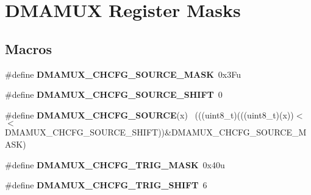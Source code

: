 \hypertarget{group___d_m_a_m_u_x___register___masks}{}\section{D\+M\+A\+M\+U\+X Register Masks}
\label{group___d_m_a_m_u_x___register___masks}
\subsection*{Macros}
\begin{DoxyCompactItemize}
\item 
\hypertarget{group___d_m_a_m_u_x___register___masks_ga35b279ba0b1c9e817901494cdac305c5}{}\#define {\bfseries D\+M\+A\+M\+U\+X\+\_\+\+C\+H\+C\+F\+G\+\_\+\+S\+O\+U\+R\+C\+E\+\_\+\+M\+A\+S\+K}~0x3\+Fu\label{group___d_m_a_m_u_x___register___masks_ga35b279ba0b1c9e817901494cdac305c5}

\item 
\hypertarget{group___d_m_a_m_u_x___register___masks_gac2b7553c4599d8e919750598dd03f8a3}{}\#define {\bfseries D\+M\+A\+M\+U\+X\+\_\+\+C\+H\+C\+F\+G\+\_\+\+S\+O\+U\+R\+C\+E\+\_\+\+S\+H\+I\+F\+T}~0\label{group___d_m_a_m_u_x___register___masks_gac2b7553c4599d8e919750598dd03f8a3}

\item 
\hypertarget{group___d_m_a_m_u_x___register___masks_ga7e6dbf37a88078ee1e84987e92d737db}{}\#define {\bfseries D\+M\+A\+M\+U\+X\+\_\+\+C\+H\+C\+F\+G\+\_\+\+S\+O\+U\+R\+C\+E}(x)                                  ~(((uint8\+\_\+t)(((uint8\+\_\+t)(x))$<$$<$D\+M\+A\+M\+U\+X\+\_\+\+C\+H\+C\+F\+G\+\_\+\+S\+O\+U\+R\+C\+E\+\_\+\+S\+H\+I\+F\+T))\&D\+M\+A\+M\+U\+X\+\_\+\+C\+H\+C\+F\+G\+\_\+\+S\+O\+U\+R\+C\+E\+\_\+\+M\+A\+S\+K)\label{group___d_m_a_m_u_x___register___masks_ga7e6dbf37a88078ee1e84987e92d737db}

\item 
\hypertarget{group___d_m_a_m_u_x___register___masks_gafd2b6158f86bedffb640e73c40cdd0f5}{}\#define {\bfseries D\+M\+A\+M\+U\+X\+\_\+\+C\+H\+C\+F\+G\+\_\+\+T\+R\+I\+G\+\_\+\+M\+A\+S\+K}~0x40u\label{group___d_m_a_m_u_x___register___masks_gafd2b6158f86bedffb640e73c40cdd0f5}

\item 
\hypertarget{group___d_m_a_m_u_x___register___masks_ga714a6b142fde49d701e3f624bb2417e1}{}\#define {\bfseries D\+M\+A\+M\+U\+X\+\_\+\+C\+H\+C\+F\+G\+\_\+\+T\+R\+I\+G\+\_\+\+S\+H\+I\+F\+T}~6\label{group___d_m_a_m_u_x___register___masks_ga714a6b142fde49d701e3f624bb2417e1}


\end{DoxyCompactItemize}
